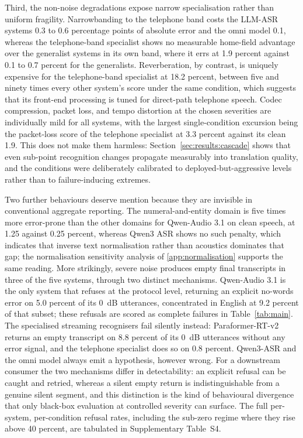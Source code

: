Third, the non-noise degradations expose narrow specialisation rather than
uniform fragility. Narrowbanding to the telephone band costs the LLM-ASR
systems 0.3 to 0.6 percentage points of absolute error and the omni model
0.1, whereas the telephone-band specialist shows no measurable home-field
advantage over the generalist systems in its own band, where it errs at 1.9
percent against 0.1 to 0.7 percent for the generalists. Reverberation, by
contrast, is uniquely expensive for the telephone-band specialist at 18.2
percent, between five and ninety times every other system's score under
the same condition, which suggests that its front-end processing is tuned
for direct-path telephone speech. Codec compression, packet loss, and
tempo distortion at the chosen severities are individually mild for all
systems, with the largest single-condition excursion being the packet-loss
score of the telephone specialist at 3.3 percent against its clean 1.9.
This does not make them harmless: Section~\ref{sec:results:cascade}
shows that even sub-point recognition changes propagate measurably into
translation quality, and the conditions were deliberately calibrated to
deployed-but-aggressive levels rather than to failure-inducing extremes.

Two further behaviours deserve mention because they are invisible in
conventional aggregate reporting. The numeral-and-entity domain is five times
more error-prone than the other domains for Qwen-Audio 3.1 on clean speech,
at 1.25 against 0.25 percent, whereas Qwen3 ASR shows no such penalty, which
indicates that inverse text normalisation rather than acoustics dominates
that gap; the normalisation sensitivity analysis of
\ref{app:normalisation} supports the same reading. More strikingly,
severe noise produces empty final transcripts in three of the five systems,
through two distinct mechanisms. Qwen-Audio 3.1 is the only system that
refuses at the protocol level, returning an explicit no-words error on 5.0
percent of its 0~dB utterances, concentrated in English at 9.2 percent of
that subset; these refusals are scored as complete failures in
Table~\ref{tab:main}. The specialised streaming recognisers fail silently
instead: Paraformer-RT-v2 returns an empty transcript on 8.8 percent of its
0~dB utterances without any error signal, and the telephone specialist does
so on 0.8 percent. Qwen3-ASR and the omni model always emit a hypothesis,
however wrong. For a downstream consumer the two mechanisms differ in
detectability: an explicit refusal can be caught and retried, whereas a
silent empty return is indistinguishable from a genuine silent segment, and
this distinction is the kind of behavioural divergence that only black-box
evaluation at controlled severity can surface. The full per-system,
per-condition refusal rates, including the sub-zero regime where they rise
above 40 percent, are tabulated in Supplementary Table~S4.


